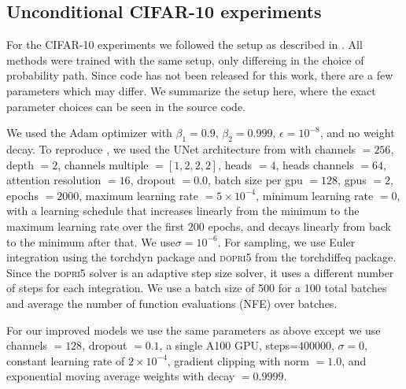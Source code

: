 \documentclass[10pt]{article}
\theoremstyle{plain}
\theoremstyle{definition}
\theoremstyle{remark}
\begin{document}
\subsection{Unconditional CIFAR-10 experiments}
\label{app:cifar10}

For the CIFAR-10 experiments we followed the setup as described in \citet{lipman_flow_2022}. All methods were trained with the same setup, only differeing in the choice of probability path. Since code has not been released for this work, there are a few parameters which may differ. We summarize the setup here, where the exact parameter choices can be seen in the source code. 

We used the Adam optimizer with $\beta_1 = 0.9$, $\beta_2 = 0.999$, $\epsilon=10^{-8}$, and no weight decay. To reproduce \citet{lipman_flow_2022}, we used the UNet architecture from \citet{dhariwal_diffusion_2021} with channels $=256$, depth $=2$, channels multiple $=[1,2,2,2]$, heads $=4$, heads channels $=64$, attention resolution $=16$, dropout $=0.0$, batch size per gpu $= 128$, gpus $=2$, epochs $=2000$, maximum learning rate $= 5 \times 10^{-4}$, minimum learning rate $= 0$, with a learning schedule that increases linearly from the minimum to the maximum learning rate over the first $200$ epochs, and decays linearly from back to the minimum after that. We use$\sigma = 10^{-6}$. For sampling, we use Euler integration using the torchdyn package and \textsc{dopri5} from the torchdiffeq package. Since the \textsc{dopri5} solver is an adaptive step size solver, it uses a different number of steps for each integration. We use a batch size of 500 for a 100 total batches and average the number of function evaluations (NFE) over batches. 

For our improved models we use the same parameters as above except we use channels $=128$, dropout $=0.1$, a single A100 GPU, steps=$400000$, $\sigma = 0$, constant learning rate of $2 \times 10^{-4}$, gradient clipping with norm $=1.0$, and exponential moving average weights with decay $=0.9999$.
\end{document}
